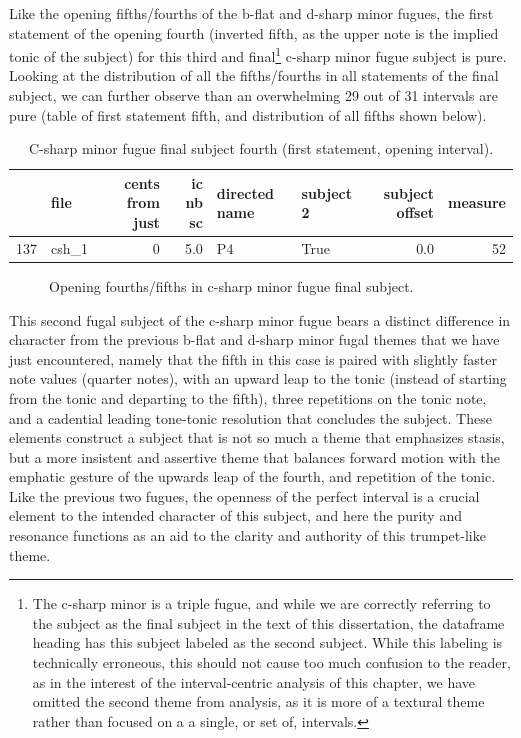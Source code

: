 Like the opening fifths/fourths of the b-flat and d-sharp minor fugues,
the first statement of the opening fourth (inverted fifth, as the upper
note is the implied tonic of the subject) for this third and
final\footnote{The c-sharp minor is a triple fugue, and while we are correctly referring to the subject as the final subject in the text of this dissertation, the dataframe heading has this subject labeled as the second subject. While this labeling is technically erroneous, this should not cause too much confusion to the reader, as in the interest of the interval-centric analysis of this chapter, we have omitted the second theme from analysis, as it is more of a textural theme rather than focused on a a single, or set of, intervals.}
c-sharp minor fugue subject is pure. Looking at the distribution of all
the fifths/fourths in all statements of the final subject, we can
further observe than an overwhelming 29 out of 31 intervals are pure
(table of first statement fifth, and distribution of all fifths shown
below).

\begin{singlespace}
\begin{table}[H]
\centering
\tiny
\begin{tabular}{|llrrllrr|}
\hline
\textbf{{}} & \textbf{  file} & \textbf{ cents from just} & \textbf{ ic nb sc} & \textbf{directed name} & \textbf{subject 2} & \textbf{ subject offset} & \textbf{ measure }\\
\hline
137 &  csh\_1 &                0 &       5.0 &            P4 &      True &             0.0 &       52 \\
\hline
\end{tabular}
\caption{C-sharp minor fugue final subject fourth (first statement, opening interval). }
\end{table}
\normalsize
\end{singlespace}




\begin{figure}[H]
\vspace{1.5em}
    \centering
    \caption{Opening fourths/fifths in c-sharp minor fugue final subject. }
\end{figure}    This second fugal subject of the c-sharp minor fugue bears a distinct
difference in character from the previous b-flat and d-sharp minor fugal
themes that we have just encountered, namely that the fifth in this case
is paired with slightly faster note values (quarter notes), with an
upward leap to the tonic (instead of starting from the tonic and
departing to the fifth), three repetitions on the tonic note, and a
cadential leading tone-tonic resolution that concludes the subject.
These elements construct a subject that is not so much a theme that
emphasizes stasis, but a more insistent and assertive theme that
balances forward motion with the emphatic gesture of the upwards leap of
the fourth, and repetition of the tonic. Like the previous two fugues,
the openness of the perfect interval is a crucial element to the
intended character of this subject, and here the purity and resonance
functions as an aid to the clarity and authority of this trumpet-like
theme.

